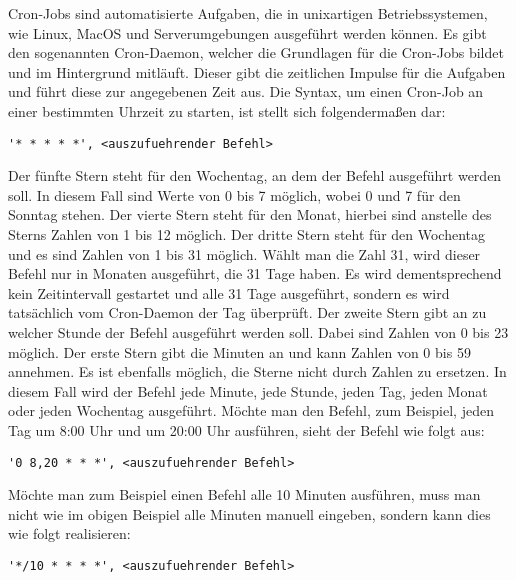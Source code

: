 Cron-Jobs sind automatisierte Aufgaben, die in unixartigen Betriebssystemen, wie Linux, MacOS und Serverumgebungen ausgeführt werden können. Es gibt den sogenannten Cron-Daemon, welcher die Grundlagen für die Cron-Jobs bildet und im Hintergrund mitläuft. Dieser gibt die zeitlichen Impulse für die Aufgaben und führt diese zur angegebenen Zeit aus. Die Syntax, um einen Cron-Job an einer bestimmten Uhrzeit zu starten, ist stellt sich folgendermaßen dar:
\cite{cron_jobs_basics}
\newline
\begin{lstlisting}
'* * * * *', <auszufuehrender Befehl>
\end{lstlisting}
Der fünfte Stern steht für den Wochentag, an dem der Befehl ausgeführt werden soll. In diesem Fall sind Werte von 0 bis 7 möglich, wobei 0 und 7 für den Sonntag stehen.
\newline
Der vierte Stern steht für den Monat, hierbei sind anstelle des Sterns Zahlen von 1 bis 12 möglich.
\newline
Der dritte Stern steht für den Wochentag und es sind Zahlen von 1 bis 31 möglich. Wählt man die Zahl 31, wird dieser Befehl nur in Monaten ausgeführt, die 31 Tage haben. Es wird dementsprechend kein Zeitintervall gestartet und alle 31 Tage ausgeführt, sondern es wird tatsächlich vom Cron-Daemon der Tag überprüft.
\newline
Der zweite Stern gibt an zu welcher Stunde der Befehl ausgeführt werden soll. Dabei sind Zahlen von 0 bis 23 möglich.
\newline
Der erste Stern gibt die Minuten an und kann Zahlen von 0 bis 59 annehmen.
\newline
Es ist ebenfalls möglich, die Sterne nicht durch Zahlen zu ersetzen. In diesem Fall wird der Befehl jede Minute, jede Stunde, jeden Tag, jeden Monat oder jeden Wochentag ausgeführt. Möchte man den Befehl, zum Beispiel, jeden Tag um 8:00 Uhr und um 20:00 Uhr ausführen, sieht der Befehl wie folgt aus:
\newline
\begin{lstlisting}
'0 8,20 * * *', <auszufuehrender Befehl>
\end{lstlisting}
Möchte man zum Beispiel einen Befehl alle 10 Minuten ausführen, muss man nicht wie im obigen Beispiel alle Minuten manuell eingeben, sondern kann dies wie folgt realisieren:
\newline
\begin{lstlisting}
'*/10 * * * *', <auszufuehrender Befehl>
\end{lstlisting}
\cite{cron_jobs_scheduling_examples}